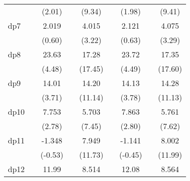 {\begin{tabular}{l*{8}{c}}
            &                     &      (2.01)         &                     &      (9.34)         &                     &      (1.98)         &                     &      (9.41)         \\
[1em]
dp7         &                     &       2.019         &                     &       4.015\sym{**} &                     &       2.121         &                     &       4.075\sym{**} \\
            &                     &      (0.60)         &                     &      (3.22)         &                     &      (0.63)         &                     &      (3.29)         \\
[1em]
dp8         &                     &       23.63\sym{***}&                     &       17.28\sym{***}&                     &       23.72\sym{***}&                     &       17.35\sym{***}\\
            &                     &      (4.48)         &                     &     (17.45)         &                     &      (4.49)         &                     &     (17.60)         \\
[1em]
dp9         &                     &       14.01\sym{***}&                     &       14.20\sym{***}&                     &       14.13\sym{***}&                     &       14.28\sym{***}\\
            &                     &      (3.71)         &                     &     (11.14)         &                     &      (3.78)         &                     &     (11.13)         \\
[1em]
dp10        &                     &       7.753\sym{**} &                     &       5.703\sym{***}&                     &       7.863\sym{**} &                     &       5.761\sym{***}\\
            &                     &      (2.78)         &                     &      (7.45)         &                     &      (2.80)         &                     &      (7.62)         \\
[1em]
dp11        &                     &      -1.348         &                     &       7.949\sym{***}&                     &      -1.141         &                     &       8.002\sym{***}\\
            &                     &     (-0.53)         &                     &     (11.73)         &                     &     (-0.45)         &                     &     (11.99)         \\
[1em]
dp12        &                     &       11.99\sym{***}&                     &       8.514\sym{***}&                     &       12.08\sym{***}&                     &       8.564\sym{***}\\

\end{tabular}}

